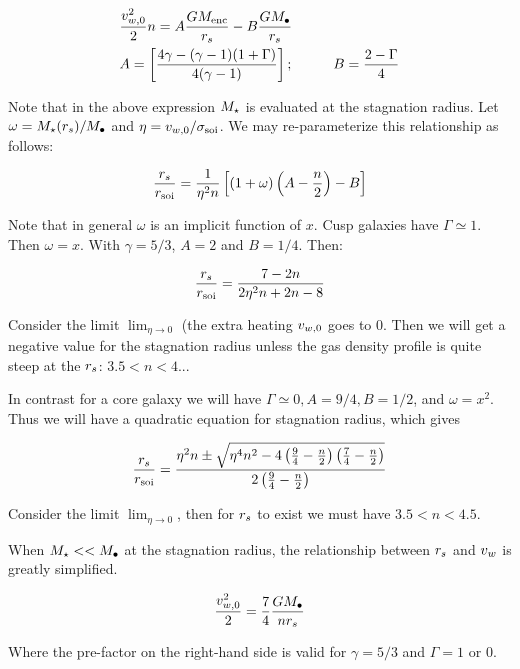 \begin{align}
&\frac{v_{w,0}^2}{2} n =A \frac{G M_{\rm enc}}{r_s} -B \frac{G M_{\bullet}}{r_s}\\
&A=\left[\frac{4\gamma-(\gamma-1)(1+\Gamma)}{4(\gamma-1)}\right]; \hspace{1cm} B=\frac{2-\Gamma}{4} 
\end{align}

Note that in the above expression $M_{\star}$ is evaluated at the stagnation radius. Let $\omega=M_{\star}(r_s)/M_{\bullet}$ and 
$\eta=v_{w,0}/\sigma_{\rm soi}$. We may re-parameterize this relationship as follows:

\begin{align}
\frac{r_s}{r_{\rm soi}}=\frac{1}{\eta^2 n}\left[ (1+\omega)\left(A-\frac{n}{2}\right)-B\right]
\end{align}

Note that in general $\omega$ is an implicit function of $x$. Cusp galaxies have $\Gamma\simeq1$.  Then $\omega=x$. With $\gamma=5/3$, $A=2$ and $B=1/4$.  Then:

\begin{align}
\frac{r_s}{r_{\rm soi}}=\frac{7-2n}{2\eta^2 n+2n-8}
\end{align}

Consider the limit $\lim_{\eta \to 0}$ (the extra heating $v_{w,0}$ goes to 0. Then we will get a negative value for the stagnation radius unless the gas density profile is quite steep at the $r_s$: $3.5<n<4$...

In contrast for a core galaxy we will have $\Gamma\simeq0, A=9/4, B=1/2$, and  $\omega=x^2$. Thus we will have a quadratic equation for stagnation radius, which gives

\begin{align}
\frac{r_s}{r_{\rm soi}}=\frac{\eta^2 n \pm \sqrt{\eta^4 n^2 -4 \left(\frac{9}{4}-\frac{n}{2}\right) \left(\frac{7}{4}-\frac{n}{2}\right)}}{2\left(\frac{9}{4}-\frac{n}{2}\right)}
\end{align}

Consider the limit $\lim_{\eta \to 0}$, then for $r_s$ to exist we must have $3.5<n<4.5$.

When $M_{\star} << M_{\bullet}$ at the stagnation radius, the relationship between $r_s$ and $v_w$ is greatly simplified. 

\begin{align}
\frac{v_{w,0}^2}{2}=\frac{7}{4}\frac{G M_{\bullet}}{n r_s}
\end{align}

Where the pre-factor on the right-hand side is valid for $\gamma=5/3$ and $\Gamma=1$ or 0.  


